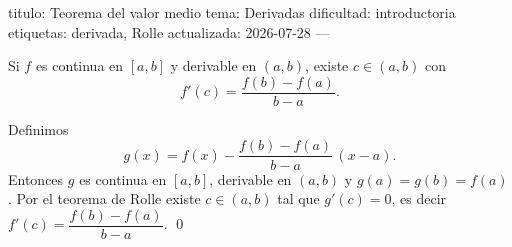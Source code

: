 titulo: Teorema del valor medio
tema: Derivadas
dificultad: introductoria
etiquetas: derivada, Rolle
actualizada: 2026-07-28
---
\begin{teorema}
Si $f$ es continua en $[a,b]$ y derivable en $(a,b)$, existe $c \in (a,b)$ con
\[
  f'(c) = \frac{f(b)-f(a)}{b-a}.
\]
\end{teorema}

\begin{demostracion}
Definimos
\[
  g(x) = f(x) - \frac{f(b)-f(a)}{b-a}\,(x-a).
\]
Entonces $g$ es continua en $[a,b]$, derivable en $(a,b)$ y $g(a)=g(b)=f(a)$.
Por el teorema de Rolle existe $c \in (a,b)$ tal que $g'(c)=0$, es decir
$f'(c) = \dfrac{f(b)-f(a)}{b-a}$. \qed
\end{demostracion}
